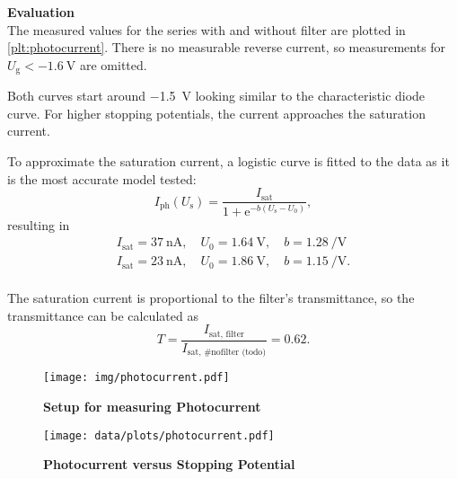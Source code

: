 \textbf{Evaluation}\\
The measured values for the series with and without filter are plotted in \autoref{plt:photocurrent}.
There is no measurable reverse current, so measurements for $U_\text{g} < \SI{-1.6}{\volt}$ are omitted.

Both curves start around \SI{-1.5}{\volt} looking similar to the characteristic diode curve.
For higher stopping potentials, the current approaches the saturation current.

To approximate the saturation current, a logistic curve is fitted to the data as it is the most accurate model tested:
\begin{equation*}
	I_\text{ph}(U_\text{s}) = \frac{I_\text{sat}}{1 + \mathrm{e}^{-b (U_\text{s} - U_0)}},
\end{equation*}
resulting in
\begin{gather*}
	I_\text{sat} = \SI{37}{\nA}, \quad U_0 = \SI{1.64}{\volt}, \quad b = \SI{1.28}{\per\volt} \tag{no filter}\\
	I_\text{sat} = \SI{23}{\nA}, \quad U_0 = \SI{1.86}{\volt}, \quad b = \SI{1.15}{\per\volt}. \tag{filter}\\
\end{gather*}

The saturation current is proportional to the filter's transmittance, so the transmittance can be calculated as
\begin{equation*}
	T = \frac{I_\text{sat, filter}}{I_\text{sat, \#nofilter (todo)}} = \num{0.62}.
\end{equation*}

\begin{figure}[tbp]
	\centering
	\texttt{[image: img/photocurrent.pdf]}
	\caption[Setup for measuring Photocurrent]{\textbf{Setup for measuring Photocurrent}}
	\label{sch:photocurrent}
\end{figure}

\begin{figure}[tbp]
	\centering
	\texttt{[image: data/plots/photocurrent.pdf]}
	\caption[Photocurrent versus Stopping Potential]{\textbf{Photocurrent versus Stopping Potential}}
	\label{plt:photocurrent}
\end{figure}
